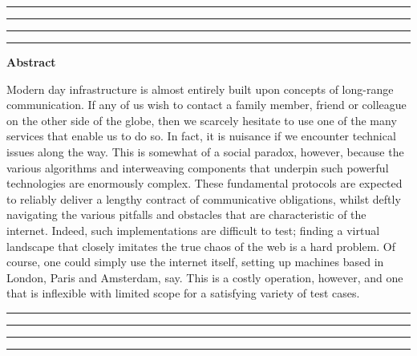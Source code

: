 \thispagestyle{empty}
\hrule\hrule\hrule\hrule %
\begin{center}
    \textbf{\large Abstract}
    \\
\end{center}

Modern day infrastructure is almost entirely built upon concepts of long-range communication. If any of us wish to
contact a family member, friend or colleague on the other side of the globe, then we scarcely hesitate to use one of
the many services that enable us to do so. In fact, it is nuisance if we encounter technical issues along the way. This
is somewhat of a social paradox, however, because the various algorithms and interweaving components that underpin
such powerful technologies are enormously complex. These fundamental protocols are expected to reliably deliver a
lengthy contract of communicative obligations, whilst deftly navigating the various pitfalls and obstacles that are
characteristic of the internet. Indeed, such implementations are difficult to test; finding a virtual landscape that
closely imitates the true chaos of the web is a hard problem. Of course, one could simply use the internet itself,
setting up machines based in London, Paris and Amsterdam, say. This is a costly operation, however, and one that is
inflexible with limited scope for a satisfying variety of test cases.


\vfill
\hrule\hrule\hrule\hrule
\clearpage
